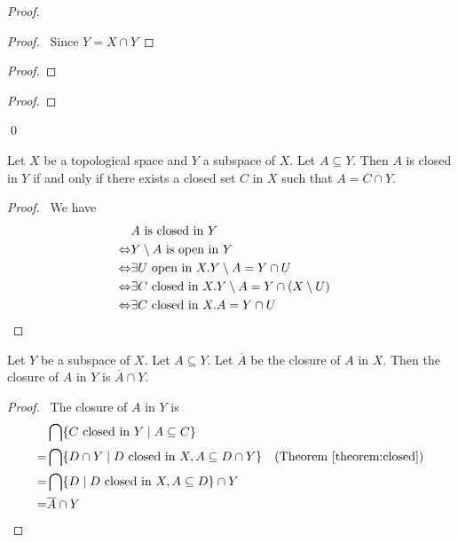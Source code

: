 \begin{proof}
    \pf
    \begin{proof}
        \pf\ Since $Y = X \cap Y$
    \end{proof}
    \begin{proof}
    \end{proof}
    \begin{proof}
    \end{proof}
    \qed
\end{proof}

\begin{theorem}
    \label{theorem:closed}
    Let $X$ be a topological space and $Y$ a subspace of $X$. Let $A \subseteq Y$. Then $A$ is closed in $Y$
    if and only if there exists a closed set $C$ in $X$ such that $A = C \cap Y$.
\end{theorem}

\begin{proof}
    \pf\ 
    We have
    \begin{align*}
        & A \text{ is closed in } Y \\
        \Leftrightarrow & Y \setminus A \text{ is open in } Y \\
        \Leftrightarrow & \exists U \text{ open in } X. Y \setminus A = Y \cap U \\
        \Leftrightarrow & \exists C \text{ closed in } X. Y \setminus A = Y \cap (X \setminus U) \\
        \Leftrightarrow & \exists C \text{ closed in } X. A = Y \cap U & \qed
    \end{align*}
\end{proof}

\begin{theorem}
    Let $Y$ be a subspace of $X$. Let $A \subseteq Y$. Let $\overline{A}$ be the closure of $A$ in $X$.
    Then the closure of $A$ in $Y$ is $\overline{A} \cap Y$.
\end{theorem}

\begin{proof}
    \pf\ The closure of $A$ in $Y$ is
    \begin{align*}
        & \bigcap \{ C \text{ closed in } Y \mid A \subseteq C \} \\
        = & \bigcap \{ D \cap Y \mid D \text{ closed in } X, A \subseteq D \cap Y \} 
            & (\text{Theorem \ref{theorem:closed}})\\
        = & \bigcap \{ D \mid D \text{ closed in } X, A \subseteq D \} \cap Y \\
        = & \overline{A} \cap Y & \qed
    \end{align*}
\end{proof}

